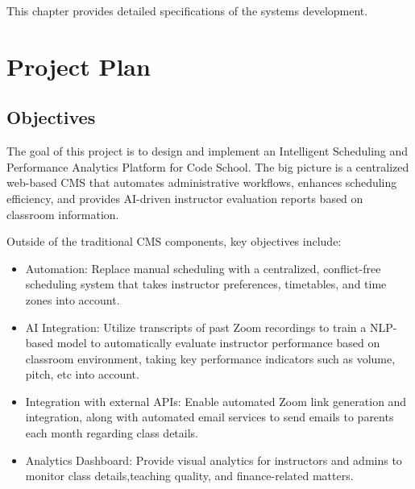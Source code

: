This chapter provides detailed specifications of the systems development.

\section{Project Plan}
\subsection{Objectives}
The goal of this project is to design and implement an Intelligent Scheduling and Performance Analytics Platform for Code School. The big picture is a centralized web-based CMS that automates administrative workflows, enhances scheduling efficiency, and provides AI-driven instructor evaluation reports based on classroom information.

Outside of the traditional CMS components, key objectives include:
\begin{itemize}
    \item Automation: Replace manual scheduling with a centralized, conflict-free scheduling system that takes instructor preferences, timetables, and time zones into account. 
    \item AI Integration: Utilize transcripts of past Zoom recordings to train a NLP-based model to automatically evaluate instructor performance based on classroom environment, taking key performance indicators such as volume, pitch, etc into account. 
    \item Integration with external APIs: Enable automated Zoom link generation and integration, along with automated email services to send emails to parents each month regarding class details.  
    \item Analytics Dashboard: Provide visual analytics for instructors and admins to monitor class details,teaching quality, and finance-related matters. 
\end{itemize}

